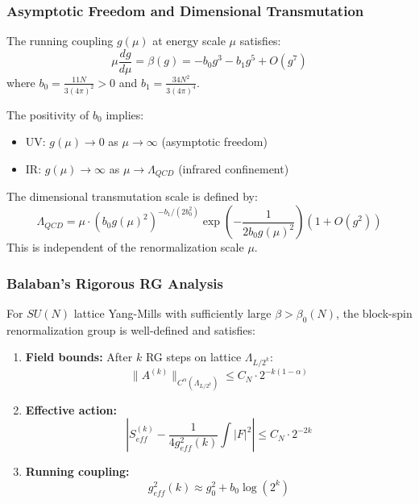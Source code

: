 \subsubsection{Asymptotic Freedom and Dimensional Transmutation}

\begin{theorem}
\label{thm:asymptotic_freedom}
The running coupling $g(\mu)$ at energy scale $\mu$ satisfies:
\begin{equation}
\mu \frac{dg}{d\mu} = \beta(g) = -b_0 g^3 - b_1 g^5 + O(g^7)
\end{equation}
where $b_0 = \frac{11N}{3(4\pi)^2} > 0$ and $b_1 = \frac{34N^2}{3(4\pi)^4}$.
\end{theorem}

The positivity of $b_0$ implies:
\begin{itemize}
\item UV: $g(\mu) \to 0$ as $\mu \to \infty$ (asymptotic freedom)
\item IR: $g(\mu) \to \infty$ as $\mu \to \Lambda_{QCD}$ (infrared confinement)
\end{itemize}

\begin{definition}
The dimensional transmutation scale is defined by:
\begin{equation}
\Lambda_{QCD} = \mu \cdot (b_0 g(\mu)^2)^{-b_1/(2b_0^2)} \exp\left(-\frac{1}{2b_0 g(\mu)^2}\right) \left(1 + O(g^2)\right)
\end{equation}
This is independent of the renormalization scale $\mu$.
\end{definition}

\subsubsection{Balaban's Rigorous RG Analysis}

\begin{theorem}
\label{thm:balaban_uv}
For $SU(N)$ lattice Yang-Mills with sufficiently large $\beta > \beta_0(N)$, the block-spin renormalization group is well-defined and satisfies:
\begin{enumerate}
\item \textbf{Field bounds:} After $k$ RG steps on lattice $\Lambda_{L/2^k}$:
\begin{equation}
\|A^{(k)}\|_{C^\alpha(\Lambda_{L/2^k})} \leq C_N \cdot 2^{-k(1-\alpha)}
\end{equation}

\item \textbf{Effective action:}
\begin{equation}
\left| S_{eff}^{(k)} - \frac{1}{4g_{eff}^2(k)} \int |F|^2 \right| \leq C_N \cdot 2^{-2k}
\end{equation}

\item \textbf{Running coupling:}
\begin{equation}
g_{eff}^2(k) \approx g_0^2 + b_0 \log(2^k)
\end{equation}
\end{enumerate}
\end{theorem}

